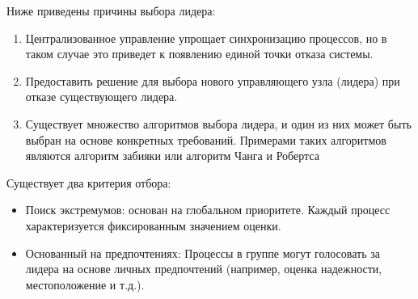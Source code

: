Ниже приведены причины выбора лидера:
\begin{enumerate}
  \item Централизованное управление упрощает синхронизацию процессов, но в таком случае это приведет к появлению единой точки отказа системы.
  \item Предоставить решение для выбора нового управляющего узла (лидера) при отказе существующего лидера.
  \item Существует множество алгоритмов выбора лидера, и один из них может быть выбран на основе конкретных требований. Примерами таких алгоритмов являются алгоритм забияки или алгоритм Чанга и Робертса
\end{enumerate}

Существует два критерия отбора:
\begin{itemize}
  \item Поиск экстремумов: основан на глобальном приоритете. Каждый процесс характеризуется фиксированным значением оценки.
  \item Основанный на предпочтениях: Процессы в группе могут голосовать за лидера на основе личных предпочтений (например, оценка надежности, местоположение и т.д.).
\end{itemize}


